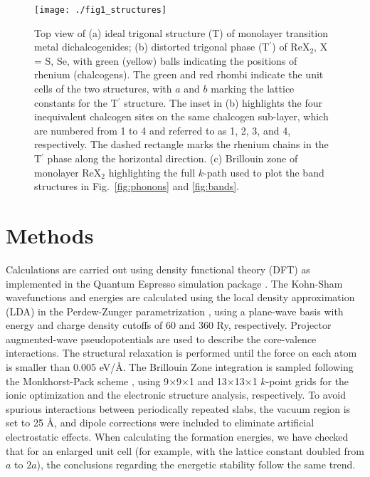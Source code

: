\documentclass[reprint, superscriptaddress, amsmath,amssymb,prb,twocolumn]{revtex4-2}
\newcommand\SOne{1}
\newcommand\STwo{2}
\newcommand\SThree{3}
\newcommand\SFour{4}
\begin{document}
\begin{figure}[!t]
\begin{center}
\texttt{[image: ./fig1\_structures]}
\caption{Top view of (a) ideal trigonal structure (T) of monolayer transition metal dichalcogenides; (b) distorted trigonal phase (T$^\prime$) of ReX$_2$, X = S, Se, with green (yellow) balls indicating the positions of rhenium (chalcogens). The green and red rhombi indicate the unit cells of the two structures, with $a$ and $b$ marking the lattice constants for the T$^\prime$ structure. The inset in (b) highlights the four inequivalent chalcogen sites on the same chalcogen sub-layer, which are numbered from 1 to 4 and referred to as \SOne{}, \STwo{}, \SThree{}, and \SFour{}, respectively. The dashed rectangle marks the rhenium chains in the T$^\prime$ phase along the horizontal direction. (c) Brillouin zone of monolayer ReX$_2$ highlighting the full $k$-path used to plot the band structures in Fig.~\ref{fig:phonons} and \ref{fig:bands}.}
\label{fig:structures}
\end{center}
\end{figure}

\section{Methods}\label{sec.results}

Calculations are carried out using density functional theory (DFT) \cite{kohn_physrev_1965} as implemented in the Quantum Espresso simulation package \cite{gianozzi_jpcm_2009, gianozzi_jpcm_2017}. The Kohn-Sham wavefunctions and energies are calculated using the local density approximation (LDA) in the Perdew-Zunger parametrization \cite{pz_1981}, using a plane-wave basis with energy and charge density cutoffs of 60 and 360 Ry, respectively. Projector augmented-wave pseudopotentials \cite{PAW1994} are used to describe the core-valence interactions. The structural relaxation is performed until the force on each atom is smaller than 0.005 eV/\AA. The Brillouin Zone integration is sampled following the Monkhorst-Pack scheme \cite{monkhorst_prb_1976}, using 9$\times$9$\times$1 and 13$\times$13$\times$1 $k$-point grids for the ionic optimization and the electronic structure analysis, respectively. To avoid spurious interactions between periodically repeated slabs, the vacuum region is set to 25 \AA, and dipole corrections were included to eliminate artificial electrostatic effects. When calculating the formation energies, we have checked that for an enlarged unit cell (for example, with the lattice constant doubled from $a$ to $2a$), the conclusions regarding the energetic stability follow the same trend.
\end{document}
